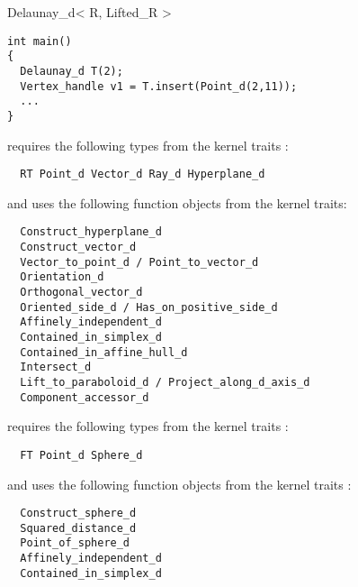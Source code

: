 \begin{ccRefClass}{Delaunay_d< R, Lifted_R >}
\begin{verbatim}
int main()
{
  Delaunay_d T(2);
  Vertex_handle v1 = T.insert(Point_d(2,11));
  ...
}
\end{verbatim}
 




 requires the following types from the kernel traits :
\begin{verbatim}
  RT Point_d Vector_d Ray_d Hyperplane_d 
\end{verbatim}
and uses the following function objects from the kernel traits:
\begin{verbatim}
  Construct_hyperplane_d
  Construct_vector_d
  Vector_to_point_d / Point_to_vector_d
  Orientation_d
  Orthogonal_vector_d
  Oriented_side_d / Has_on_positive_side_d
  Affinely_independent_d
  Contained_in_simplex_d
  Contained_in_affine_hull_d
  Intersect_d
  Lift_to_paraboloid_d / Project_along_d_axis_d
  Component_accessor_d
\end{verbatim}
 requires the following types from the kernel traits :
\begin{verbatim}
  FT Point_d Sphere_d 
\end{verbatim}
and uses the following function objects from the kernel traits :
\begin{verbatim}
  Construct_sphere_d
  Squared_distance_d
  Point_of_sphere_d
  Affinely_independent_d
  Contained_in_simplex_d
\end{verbatim}
 






\end{ccRefClass}
